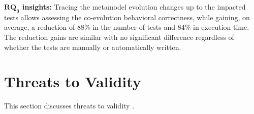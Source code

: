 \begin{tcolorbox}[boxsep=-2pt]
\textbf{$\boldsymbol{RQ_3}$ insights:}
Tracing the metamodel evolution changes up to the impacted tests allows assessing the co-evolution behavioral correctness, while %
gaining, on average, a reduction of 88\% in the number of tests and 84\% in execution time. The reduction gains are similar with no significant difference regardless of whether the tests are manually or automatically written.
\end{tcolorbox}




\section{Threats to Validity}\label{threat}
\noindent This section discusses threats to validity \cite{wohlin2012experimentation}.

